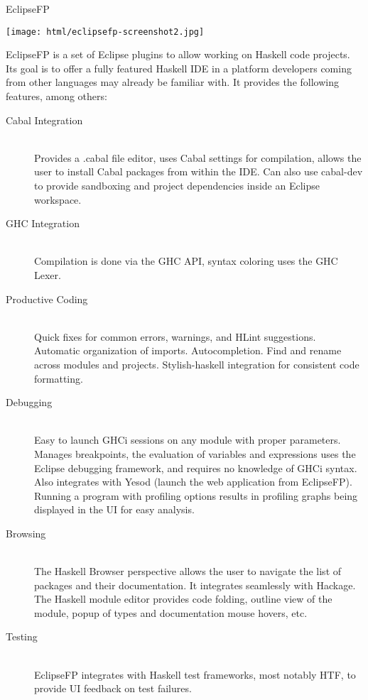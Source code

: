 \begin{hcarentry}[updated]{EclipseFP}
\makeheader

\begin{center}
\texttt{[image: html/eclipsefp-screenshot2.jpg]}
\end{center}

EclipseFP is a set of Eclipse plugins to allow working on Haskell code projects. Its goal is to offer a fully featured Haskell IDE in a platform developers coming from other languages may already be familiar with. It provides the following features, among others:

\begin{description}
  \item[Cabal Integration] \hfill \\
  Provides a .cabal file editor, uses Cabal settings for compilation, allows the user to install Cabal packages from within the IDE. Can also use cabal-dev to provide sandboxing and project dependencies inside an Eclipse workspace.
  \item[GHC Integration] \hfill \\
  Compilation is done via the GHC API, syntax coloring uses the GHC Lexer.
  \item[Productive Coding] \hfill \\
  Quick fixes for common errors, warnings, and HLint suggestions. Automatic organization of imports. Autocompletion. Find and rename across modules and projects. Stylish-haskell integration for consistent code formatting.
  \item[Debugging] \hfill \\
  Easy to launch GHCi sessions on any module with proper parameters. Manages breakpoints, the evaluation of variables and expressions uses the Eclipse debugging framework, and requires no knowledge of GHCi syntax. Also integrates with Yesod (launch the web application from EclipseFP). Running a program with profiling options results in profiling graphs being displayed in the UI for easy analysis.
  \item[Browsing] \hfill \\
  The Haskell Browser perspective allows the user to navigate the list of packages and their documentation. It integrates seamlessly with Hackage. The Haskell module editor provides code folding, outline view of the module, popup of types and documentation mouse hovers, etc.
  \item[Testing] \hfill \\
  EclipseFP integrates with Haskell test frameworks, most notably HTF, to provide UI feedback on test failures.
\end{description}


\end{hcarentry}
